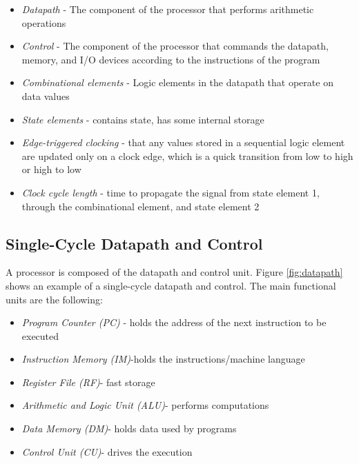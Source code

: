 \documentclass[a4paper, 11pt,oneside]{article}
\begin{document}
\begin{itemize}
	\item{\textit{Datapath} - The component of the processor that performs arithmetic operations}

	\item{\textit{Control} - The component of the processor that commands the datapath, memory, and I/O devices according to the instructions of the program}

	\item{\textit{Combinational elements} - Logic elements in the datapath that operate on data values}

	\item{\textit{State elements} - contains state, has some internal storage}

	\item{\textit{Edge-triggered clocking} - that any values stored in a sequential logic element are updated only on a clock edge, which is a quick transition from low to high or high to low}

	\item{\textit{Clock cycle length} - time to propagate the signal from state element 1, through the combinational element, and state element 2}

\end{itemize}

\subsection{Single-Cycle Datapath and Control}
A processor is composed of the datapath and control unit. Figure \ref{fig:datapath} shows an example of a 
single-cycle datapath and control. The main functional units are the following:
\begin{itemize}
	\item{\textit{Program Counter (PC)} - holds the address of the next instruction to be executed}
	\item{\textit{Instruction Memory (IM)}-holds the instructions/machine language}
	\item{\textit{Register File (RF)}- fast storage}
	\item{\textit{Arithmetic and Logic Unit (ALU)}- performs computations}
	\item{\textit{Data Memory (DM)}- holds data used by programs}
	\item{\textit{Control Unit (CU)}- drives the execution }
\end{itemize}
\end{document}
